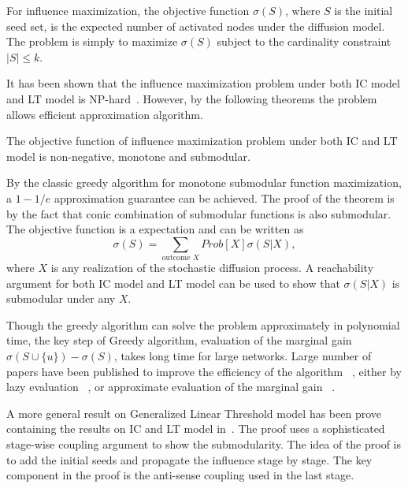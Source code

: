 For influence maximization, the objective function $\sigma(S)$, where $S$ is the initial seed set, is the expected number of activated nodes under the diffusion model. The problem is simply to maximize $\sigma(S)$ subject to the cardinality constraint $|S|\leq k$.

It has been shown that the influence maximization problem under both IC model and LT model is NP-hard~\cite{KKT03}. However, by the following theorems the problem allows efficient approximation algorithm.
 \begin{theorem}\label{Thm:KKT}
The objective function of influence maximization problem under both IC and LT model is non-negative, monotone and submodular.
\end{theorem}
By the classic greedy algorithm for monotone submodular function maximization, a $1-1/e$ approximation guarantee can be achieved. The proof of the theorem is by the fact that conic combination of submodular functions is also submodular. The objective function is a expectation and can be written as
$$
\sigma(S) = \sum_{\text{outcome }X}Prob[X]\sigma(S|X),
$$
where $X$ is any realization of the stochastic diffusion process. A reachability argument for both IC model and LT model can be used to show that $\sigma(S|X)$ is submodular under any $X$. 

Though the greedy algorithm can solve the problem approximately in polynomial time, the key step of Greedy algorithm, evaluation of the marginal gain $\sigma(S\cup\{u\})-\sigma(S)$, takes long time for large networks. Large number of papers have been published to improve the efficiency of the algorithm~\cite{Chen:2010,Leskovec:2007:COD:1281192.1281239,Goyal:2011:COG:1963192.1963217,DBLP:conf/icdm/ChenYZ10,Chen:2010:SIM:1835804.1835934} , either by lazy evaluation~\cite{Leskovec:2007:COD:1281192.1281239,Goyal:2011:COG:1963192.1963217} , or approximate evaluation of the marginal gain~\cite{Chen:2010,DBLP:conf/icdm/ChenYZ10,Chen:2010:SIM:1835804.1835934} .

A more general result on Generalized Linear Threshold model has been prove containing the results on IC and LT model in~\cite{Mossel2007}. The proof uses a sophisticated stage-wise coupling argument to show the submodularity. The idea of the proof is to add the initial seeds and propagate the influence stage by stage. The key component in the proof is the anti-sense coupling used in the last stage.

